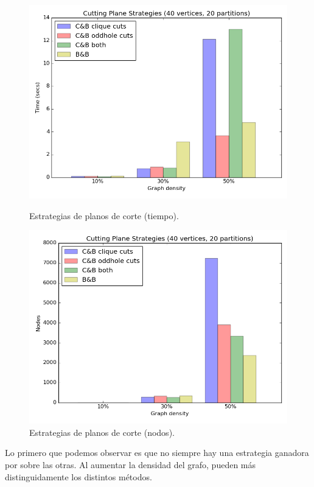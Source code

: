 \begin{figure}[h]
  \centering
  \begin{minipage}[b]{0.49\textwidth}
    \includegraphics[width=\textwidth]{img/5-cuts_v40_p20_i1_l40_t1_b0.png}
    \caption{Estrategias de planos de corte (tiempo).}
  \end{minipage}
  \hfill
  \begin{minipage}[b]{0.49\textwidth}
    \includegraphics[width=\textwidth]{img/5-cuts_v40_p20_i1_l40_t1_b0_nodes.png}
    \caption{Estrategias de planos de corte (nodos).}
  \end{minipage}
\end{figure}

Lo primero que podemos observar es que no siempre hay una estrategia ganadora por sobre las otras. Al aumentar la densidad del grafo, pueden más distinguidamente los distintos métodos.

